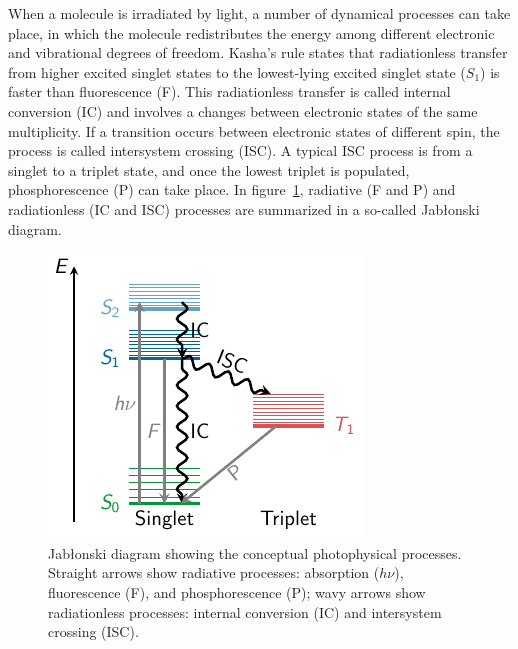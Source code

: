 \documentclass[a4paper,10pt,DIV=15,openany]{scrbook}
\begin{document}
When a molecule is irradiated by light, a number of dynamical processes can take place, in which the molecule redistributes the energy among different electronic and vibrational degrees of freedom. Kasha's rule \cite{Kasha1950DFS} states that radiationless transfer from higher excited singlet states to the lowest-lying excited singlet state ($S_1$) is faster than fluorescence (F). This radiationless transfer is called internal conversion (IC) and involves a changes between electronic states of the same multiplicity. If a transition occurs between electronic states of different spin, the process is called intersystem crossing (ISC). A typical ISC process is from a singlet to a triplet state, and once the lowest triplet is populated, phosphorescence (P) can take place. In figure~\ref{fig:jablonski}, radiative (F and P) and radiationless (IC and ISC) processes are summarized in a so-called Jab{\l}onski diagram.

\begin{figure}[!ht]
  \centering
  \includegraphics[scale=1.6]{img/jablonski/jablonski.pdf}
  \caption[Jab{\l}onski diagram showing the conceptual photophysical processes.]{Jab{\l}onski diagram showing the conceptual photophysical processes. Straight arrows show radiative processes: absorption ($h\nu$), fluorescence (F), and phosphorescence (P); wavy arrows show radiationless processes: internal conversion (IC) and intersystem crossing (ISC). }
  \label{fig:jablonski}
\end{figure}
\end{document}
